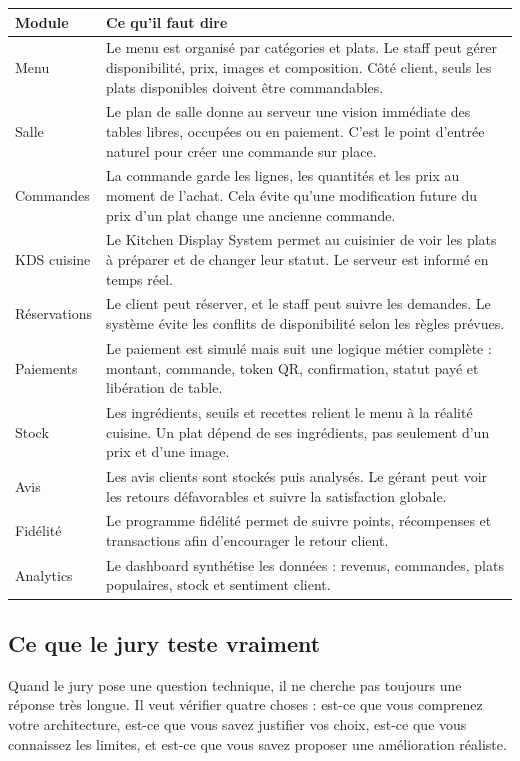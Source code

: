 \documentclass[10pt,a4paper]{article}
\begin{document}
\begin{tabularx}{\textwidth}{p{3.5cm}Y}
\toprule
\textbf{Module} & \textbf{Ce qu'il faut dire} \\
\midrule
Menu & Le menu est organisé par catégories et plats. Le staff peut gérer disponibilité, prix, images et composition. Côté client, seuls les plats disponibles doivent être commandables. \\
Salle & Le plan de salle donne au serveur une vision immédiate des tables libres, occupées ou en paiement. C'est le point d'entrée naturel pour créer une commande sur place. \\
Commandes & La commande garde les lignes, les quantités et les prix au moment de l'achat. Cela évite qu'une modification future du prix d'un plat change une ancienne commande. \\
KDS cuisine & Le Kitchen Display System permet au cuisinier de voir les plats à préparer et de changer leur statut. Le serveur est informé en temps réel. \\
Réservations & Le client peut réserver, et le staff peut suivre les demandes. Le système évite les conflits de disponibilité selon les règles prévues. \\
Paiements & Le paiement est simulé mais suit une logique métier complète : montant, commande, token QR, confirmation, statut payé et libération de table. \\
Stock & Les ingrédients, seuils et recettes relient le menu à la réalité cuisine. Un plat dépend de ses ingrédients, pas seulement d'un prix et d'une image. \\
Avis & Les avis clients sont stockés puis analysés. Le gérant peut voir les retours défavorables et suivre la satisfaction globale. \\
Fidélité & Le programme fidélité permet de suivre points, récompenses et transactions afin d'encourager le retour client. \\
Analytics & Le dashboard synthétise les données : revenus, commandes, plats populaires, stock et sentiment client. \\
\bottomrule
\end{tabularx}

\subsection{Ce que le jury teste vraiment}

\begin{tcolorbox}[title=\textbf{Lire entre les lignes}]
Quand le jury pose une question technique, il ne cherche pas toujours une réponse très longue. Il veut vérifier quatre choses : est-ce que vous comprenez votre architecture, est-ce que vous savez justifier vos choix, est-ce que vous connaissez les limites, et est-ce que vous savez proposer une amélioration réaliste.
\end{tcolorbox}
\end{document}
